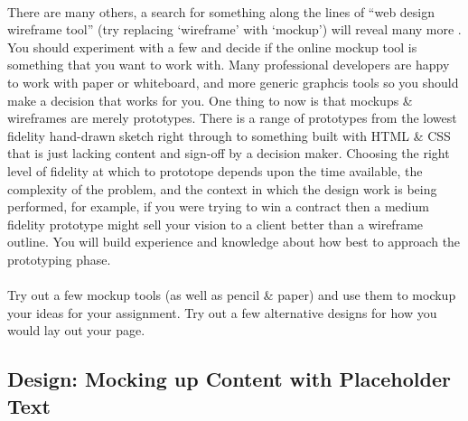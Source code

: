 \documentclass[10pt, a4paper, twosize]{article}
\begin{document}
\paragraph{} There are many others, a search for something along the lines of ``web design wireframe tool'' (try replacing `wireframe' with `mockup') will reveal many more . You should experiment with a few and decide if the online mockup tool is something that you want to work with. Many professional developers are happy to work with paper or whiteboard, and more generic graphcis tools so you should make a decision that works for you. One thing to now is that mockups  \& wireframes are merely prototypes. There is a range of prototypes from the lowest fidelity hand-drawn sketch right through to something built with HTML \& CSS that is just lacking content and sign-off by a decision maker. Choosing the right level of fidelity at which to prototope depends upon the time available, the complexity of the problem, and the context in which the design work is being performed, for example, if you were trying to win a contract then a medium fidelity prototype might sell your vision to a client better than a wireframe outline. You will build experience and knowledge about how best to approach the prototyping phase.

\paragraph{} Try out a few mockup tools (as well as pencil \& paper) and use them to mockup your ideas for your assignment. Try out a few alternative designs for how you would lay out your page.


\subsection{Design: Mocking up Content with Placeholder Text}
\end{document}

